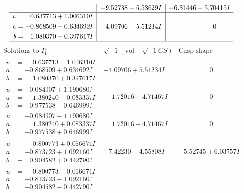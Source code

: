 \documentclass[1p]{elsarticle_modified}
\theoremstyle{definition}
\newcommand{\I}{\sqrt{-1}}
\begin{document}
$$\begin{array}{c|c|c}
 & -9.52738 - 6.53629 I & -6.31446 + 5.70415 I \\ \hline\begin{aligned}
u &= \phantom{-}0.637713 + 1.006310 I \\
a &= -0.868509 - 0.634692 I \\
b &= \phantom{-}1.080370 - 0.397617 I\end{aligned}
 & -4.09706 - 5.51234 I & \phantom{-0.000000 } 0\\
 \hline 
 \end{array}$$\newpage$$\begin{array}{c|c|c}  
\text{Solutions to }I^u_{1}& \I (\text{vol} + \sqrt{-1}CS) & \text{Cusp shape}\\
 \hline 
\begin{aligned}
u &= \phantom{-}0.637713 - 1.006310 I \\
a &= -0.868509 + 0.634692 I \\
b &= \phantom{-}1.080370 + 0.397617 I\end{aligned}
 & -4.09706 + 5.51234 I & \phantom{-0.000000 } 0 \\ \hline\begin{aligned}
u &= -0.084007 + 1.190680 I \\
a &= \phantom{-}1.380240 - 0.083337 I \\
b &= -0.977538 - 0.646999 I\end{aligned}
 & \phantom{-}1.72016 + 4.71467 I & \phantom{-0.000000 } 0 \\ \hline\begin{aligned}
u &= -0.084007 - 1.190680 I \\
a &= \phantom{-}1.380240 + 0.083337 I \\
b &= -0.977538 + 0.646999 I\end{aligned}
 & \phantom{-}1.72016 - 4.71467 I & \phantom{-0.000000 } 0 \\ \hline\begin{aligned}
u &= \phantom{-}0.800773 + 0.066671 I \\
a &= -0.873723 + 1.092160 I \\
b &= -0.904582 + 0.442790 I\end{aligned}
 & -7.42230 - 4.55808 I & -5.52745 + 6.03757 I \\ \hline\begin{aligned}
u &= \phantom{-}0.800773 - 0.066671 I \\
a &= -0.873723 - 1.092160 I \\
b &= -0.904582 - 0.442790 I\end{aligned}

\end{array}$$
\end{document}
